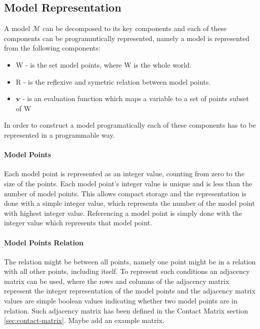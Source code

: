 \documentclass{article}
\begin{document}
	\subsection{Model Representation}
	\label{sec:model-representation}
		A model $\mathcal{M}$ can be decomposed to its key components and each of these components can be programmtically represented, namely 
		a model is represented from the following components:
		\begin{itemize}
			\item W - is the set model points, where W is the whole world.
			\item R - is the reflexive and symetric relation between model points.
			\item $\boldsymbol{v}$ - is  an evaluation function which maps a variable to a set of points subset of W
		\end{itemize}

		In order to construct a model programatically each of these components has to be represented in a programmable way.

		\paragraph{Model Points} Each model point is represented as an integer value, counting from zero to the size of the points.
		Each model point's integer value is unique and is less than the number of model points. This allows compact storage and 
		the representation is done with a simple integer value, which represents the number of the model point with highest integer value.
		Referencing a model point is simply done with the integer value which represents that model point.

		\paragraph{Model Points Relation} The relation might be between all points, namely one point might be in a relation with
		all other points, including itself. To represent such conditions an adjacency matrix can be used, where the rows and columns of the 
		adjacency matrix represent the integer representation of the model points and the adjacency matrix values are simple boolean values
		indicating whether two model points are in relation.
		Such adjacency matrix has been defined in the Contact Matrix section \ref{sec:contact-matrix}.
		\newline
		\newline
		Maybe add an example matrix.
	
\end{document}
